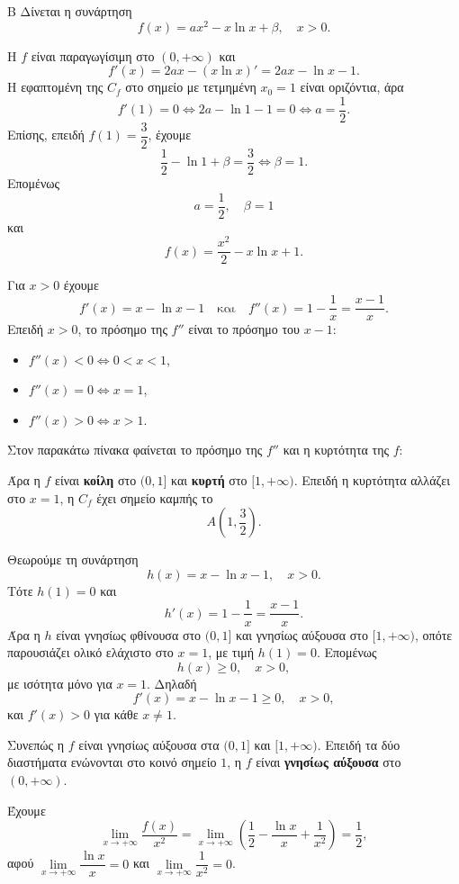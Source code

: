 \begin{thema}{Β}
Δίνεται η συνάρτηση
\[
f(x)=ax^2-x\ln x+\beta,\quad x>0.
\]

\begin{erwthma}
\item Η $f$ είναι παραγωγίσιμη στο $(0,+\infty)$ και
\[
f'(x)=2ax-(x\ln x)'=2ax-\ln x-1.
\]
Η εφαπτομένη της $C_f$ στο σημείο με τετμημένη $x_0=1$ είναι οριζόντια, άρα
\[
f'(1)=0\Leftrightarrow 2a-\ln1-1=0\Leftrightarrow a=\frac{1}{2}.
\]
Επίσης, επειδή $f(1)=\dfrac{3}{2}$, έχουμε
\[
\frac{1}{2}-\ln1+\beta=\frac{3}{2}\Leftrightarrow \beta=1.
\]
Επομένως
\[
a=\frac{1}{2},\quad \beta=1
\]
και
\[
f(x)=\frac{x^2}{2}-x\ln x+1.
\]

\item Για $x>0$ έχουμε
\[
f'(x)=x-\ln x-1
\quad\text{και}\quad
f''(x)=1-\frac{1}{x}=\frac{x-1}{x}.
\]
Επειδή $x>0$, το πρόσημο της $f''$ είναι το πρόσημο του $x-1$:
\begin{itemize}
\item $f''(x)<0\Leftrightarrow 0<x<1$,
\item $f''(x)=0\Leftrightarrow x=1$,
\item $f''(x)>0\Leftrightarrow x>1$.
\end{itemize}
Στον παρακάτω πίνακα φαίνεται το πρόσημο της $f''$ και η κυρτότητα της $f$:
\begin{center}
\end{center}
Άρα η $f$ είναι \textbf{κοίλη} στο $(0,1]$ και \textbf{κυρτή} στο $[1,+\infty)$. Επειδή η κυρτότητα αλλάζει στο $x=1$, η $C_f$ έχει σημείο καμπής το
\[
A\left(1,\frac{3}{2}\right).
\]

\item Θεωρούμε τη συνάρτηση
\[
h(x)=x-\ln x-1,\quad x>0.
\]
Τότε $h(1)=0$ και
\[
h'(x)=1-\frac{1}{x}=\frac{x-1}{x}.
\]
Άρα η $h$ είναι γνησίως φθίνουσα στο $(0,1]$ και γνησίως αύξουσα στο $[1,+\infty)$, οπότε παρουσιάζει ολικό ελάχιστο στο $x=1$, με τιμή $h(1)=0$. Επομένως
\[
h(x)\geq0,\quad x>0,
\]
με ισότητα μόνο για $x=1$. Δηλαδή
\[
f'(x)=x-\ln x-1\geq0,\quad x>0,
\]
και $f'(x)>0$ για κάθε $x\neq1$.

Συνεπώς η $f$ είναι γνησίως αύξουσα στα $(0,1]$ και $[1,+\infty)$. Επειδή τα δύο διαστήματα ενώνονται στο κοινό σημείο $1$, η $f$ είναι \textbf{γνησίως αύξουσα} στο $(0,+\infty)$.

\item Έχουμε
\[
\lim_{x\to+\infty}\frac{f(x)}{x^2}
=\lim_{x\to+\infty}\left(\frac{1}{2}-\frac{\ln x}{x}+\frac{1}{x^2}\right)
=\frac{1}{2},
\]
αφού $\lim\limits_{x\to+\infty}\dfrac{\ln x}{x}=0$ και $\lim\limits_{x\to+\infty}\dfrac{1}{x^2}=0$.
\end{erwthma}
\end{thema}

